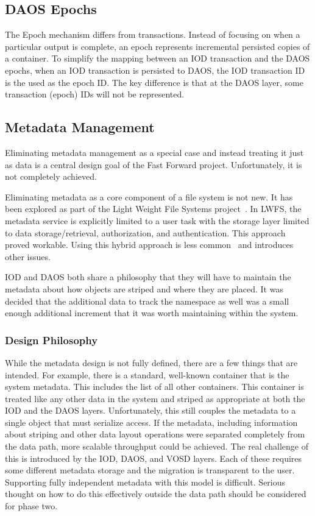\documentclass[conference]{IEEEtran}
\begin{document}
\subsection{DAOS Epochs}
The Epoch mechanism differs from transactions. Instead of focusing on when a
particular output is complete, an epoch represents incremental persisted copies
of a container. To simplify the mapping between an IOD transaction and the DAOS
epochs, when an IOD transaction is persisted to DAOS, the IOD transaction ID is
the used as the epoch ID. The key difference is that at the DAOS layer, some
transaction (epoch) IDs will not be represented.

\subsection{Metadata Management}
Eliminating metadata management as a special case and instead treating it just
as data is a central design goal of the Fast Forward project. Unfortunately,
it is not completely achieved.

Eliminating metadata as a core component of a file system is not new. It has
been explored as part of the Light Weight File Systems
project~\cite{oldfield:lwfs}. In LWFS, the metadata service is explicitly
limited to a user task with the storage layer limited to data
storage/retrieval, authorization, and authentication. This approach proved
workable. Using this hybrid approach is less common~\cite{weil:2006:ceph} and
introduces other issues.

IOD and DAOS both share a philosophy that they will have to maintain the
metadata about how objects are striped and where they are placed. It was
decided that the additional data to track the namespace as well was a small
enough additional increment that it was worth maintaining within the system.

\subsubsection{Design Philosophy}
While the metadata design is not fully defined, there are a few things that
are intended. For example, there is a standard, well-known container that is
the system metadata. This includes the list of all other containers. This
container is treated like any other data in the system and striped as
appropriate at both the IOD and the DAOS layers. Unfortunately, this still
couples the metadata to a single object that must serialize access. If the
metadata, including information about striping and other data layout operations
were separated completely from the data path, more scalable throughput could be
achieved. The real challenge of this is introduced by the IOD, DAOS, and VOSD
layers. Each of these requires some different metadata storage and the
migration is transparent to the user. Supporting fully independent metadata
with this model is difficult. Serious thought on how to do this effectively
outside the data path should be considered for phase two.
\end{document}
